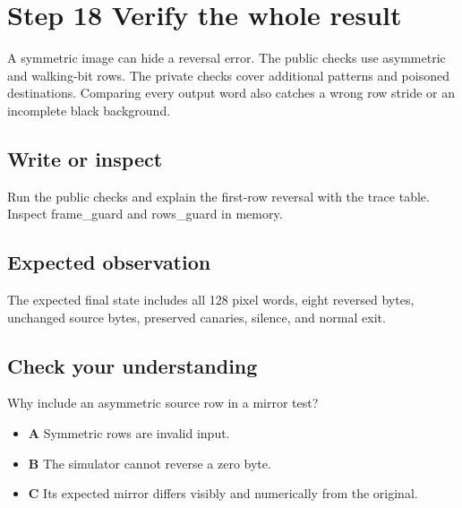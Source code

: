 \section{Step 18 Verify the whole
  result}\label{003-eight-byte-sprite-s18-step-18-verify-the-whole-result}

A symmetric image can hide a reversal error. The public checks use
asymmetric and walking-bit rows. The private checks cover additional
patterns and poisoned destinations. Comparing every output word also
catches a wrong row stride or an incomplete black background.

\subsection{Write or
  inspect}\label{003-eight-byte-sprite-s18-write-or-inspect}

Run the public checks and explain the first-row reversal with the trace
table. Inspect frame\_guard and rows\_guard in memory.

\subsection{Expected
  observation}\label{003-eight-byte-sprite-s18-expected-observation}

The expected final state includes all 128 pixel words, eight reversed
bytes, unchanged source bytes, preserved canaries, silence, and normal
exit.

\subsection{Check your
  understanding}\label{003-eight-byte-sprite-s18-check-your-understanding}

Why include an asymmetric source row in a mirror test?

\begin{itemize}
  \tightlist
  \item
        \textbf{A} Symmetric rows are invalid input.
  \item
        \textbf{B} The simulator cannot reverse a zero byte.
  \item
        \textbf{C} Its expected mirror differs visibly and numerically from
        the original.
\end{itemize}

